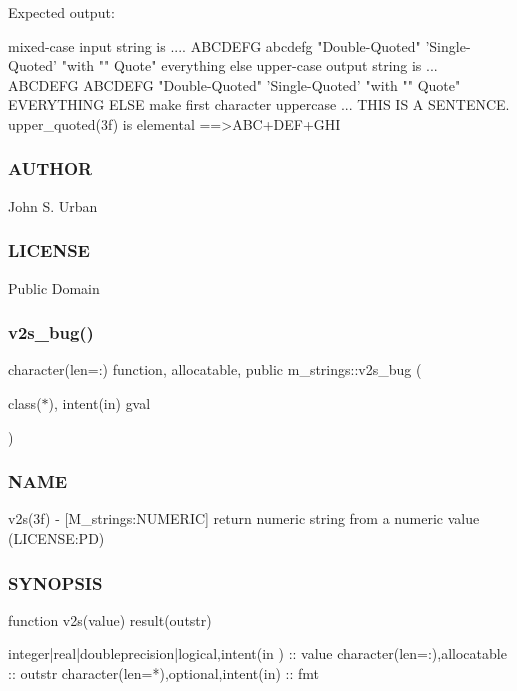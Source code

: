 Expected output\+: \begin{DoxyVerb}mixed-case input string is .... ABCDEFG abcdefg "Double-Quoted" 'Single-Quoted' "with "" Quote" everything else
upper-case output string is ... ABCDEFG ABCDEFG "Double-Quoted" 'Single-Quoted' "with "" Quote" EVERYTHING ELSE
make first character uppercase  ... THIS IS A SENTENCE.
upper_quoted(3f) is elemental ==>ABC+DEF+GHI
\end{DoxyVerb}
 \subsubsection*{A\+U\+T\+H\+OR}

John S. Urban \subsubsection*{L\+I\+C\+E\+N\+SE}

Public Domain \mbox{\label{namespacem__strings_a76a00e3ca7fb7c9b9cadcd484c6e3946}} 
\subsubsection{\texorpdfstring{v2s\+\_\+bug()}{v2s\_bug()}}
{\footnotesize\ttfamily character(len=\+:) function, allocatable, public m\+\_\+strings\+::v2s\+\_\+bug (\begin{DoxyParamCaption}\item[{class($\ast$), intent(in)}]{gval }\end{DoxyParamCaption})}



\subsubsection*{N\+A\+ME}

v2s(3f) -\/ \mbox{[}M\+\_\+strings\+:N\+U\+M\+E\+R\+IC\mbox{]} return numeric string from a numeric value (L\+I\+C\+E\+N\+SE\+:PD) 

\subsubsection*{S\+Y\+N\+O\+P\+S\+IS}

\begin{DoxyVerb}   function v2s(value) result(outstr)

    integer|real|doubleprecision|logical,intent(in ) :: value
    character(len=:),allocatable :: outstr
    character(len=*),optional,intent(in) :: fmt
\end{DoxyVerb}



